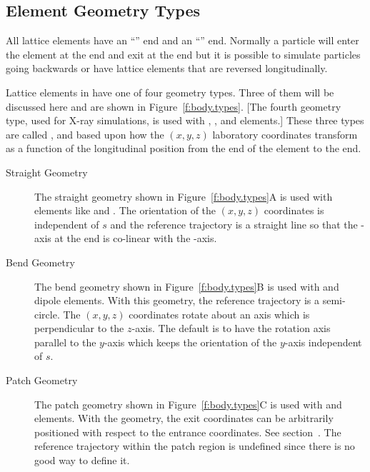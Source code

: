 \documentclass{hitec}     %
\begin{document}
\subsection{Element Geometry Types}

All lattice elements have an ``'' end and an ``'' end. Normally a particle
will enter the element at the  end and exit at the  end but it is possible to
simulate particles going backwards or have lattice elements that are reversed longitudinally.

Lattice elements in \bmad have one of four geometry types. Three of them will be discussed here and
are shown in Figure~\ref{f:body.types}. [The fourth geometry type, used for X-ray simulations, is
used with , , and  elements.] These three types are
called ,  and  based upon how the $(x, y, z)$ laboratory coordinates
transform as a function of the longitudinal  position from the  end of the
element to the  end.
\begin{description}
\item[Straight Geometry] \Newline
The straight geometry shown in Figure~\ref{f:body.types}A is used with elements like  and
. The orientation of the $(x, y, z)$ coordinates is independent of $s$ and the
reference trajectory is a straight line so that the -axis at the  end is co-linear
with the  -axis.
\item[Bend Geometry] \Newline
The bend geometry shown in Figure~\ref{f:body.types}B is used with  and  dipole
elements. With this geometry, the reference trajectory is a semi-circle. The $(x, y, z)$ coordinates
rotate about an axis which is perpendicular to the $z$-axis. The default is to have the rotation
axis parallel to the $y$-axis which keeps the orientation of the $y$-axis independent of $s$.
\item[Patch Geometry] \Newline 
The patch geometry shown in Figure~\ref{f:body.types}C is used with  and 
elements. With the  geometry, the exit coordinates can be arbitrarily positioned with
respect to the entrance coordinates. See section~. The reference trajectory within the patch
region is undefined since there is no good way to define it.
\end{description}
\end{document}
